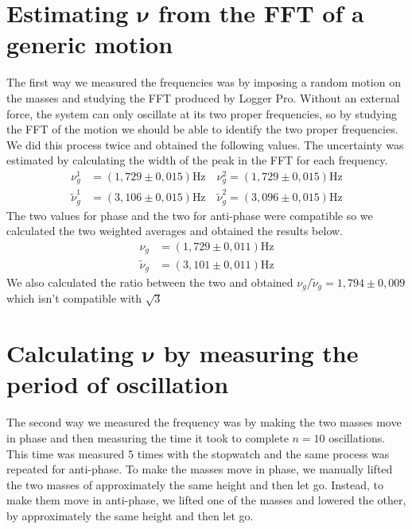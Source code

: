 \documentclass{article}
\begin{document}
\section{Estimating $\bm \nu$ from the FFT of a generic motion}
The first way we measured the frequencies was by imposing a random motion on the masses and studying the FFT produced by Logger Pro. Without an external force, the system can only oscillate at its two proper frequencies, so by studying the FFT of the motion we should be able to identify the two proper frequencies. We did this process twice and obtained the following values. The uncertainty was estimated by calculating the width of the peak in the FFT for each frequency.
\begin{align}
           \nu_g^1 &= (1,729 \pm 0,015) \text{Hz} \quad        \nu_g^2 = (1,729 \pm 0,015) \text{Hz} \\
    \tilde \nu_g^1 &= (3,106 \pm 0,015) \text{Hz} \quad \tilde \nu_g^2 = (3,096 \pm 0,015) \text{Hz}
\end{align}
The two values for phase and the two for anti-phase were compatible so we calculated the two weighted averages and obtained the results below.
\begin{align}
           \nu_g &= (1,729 \pm 0,011) \text{Hz}\\
    \tilde \nu_g &= (3,101 \pm 0,011) \text{Hz}
\end{align}
We also calculated the ratio between the two and obtained $ \nu_g / \tilde \nu_g = 1,794 \pm 0,009$ which isn't compatible with $\sqrt 3$

\section{Calculating $\bm \nu$ by measuring the period of oscillation}

The second way we measured the frequency was by making the two masses move in phase and then measuring the time it took to complete $n=10$ oscillations. This time was measured 5 times with the stopwatch and the same process was repeated for anti-phase. To make the masses move in phase, we manually lifted the two masses of approximately the same height and then let go. Instead, to make them move in anti-phase, we lifted one of the masses and lowered the other, by approximately the same height and then let go.
\end{document}
